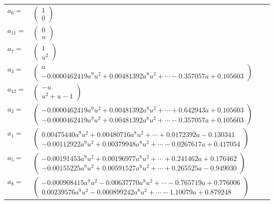 \documentclass[1p]{elsarticle_modified}
\theoremstyle{definition}
\begin{document}
\begin{tabular}{m{7pt} m{180pt} m{7pt} m{180pt} }
\flushright $a_{6}=$&$\begin{pmatrix}1\\0\end{pmatrix}$ \\
\flushright $a_{11}=$&$\begin{pmatrix}0\\u\end{pmatrix}$ \\
\flushright $a_{7}=$&$\begin{pmatrix}1\\u^2\end{pmatrix}$ \\
\flushright $a_{3}=$&$\begin{pmatrix}a\\-0.0000462419 a^{9} u^{2}+0.00481392 a^{8} u^{2}+\cdots-0.357057 a+0.105603\end{pmatrix}$ \\
\flushright $a_{12}=$&$\begin{pmatrix}- u\\u^2+u-1\end{pmatrix}$ \\
\flushright $a_{2}=$&$\begin{pmatrix}-0.0000462419 a^{9} u^{2}+0.00481392 a^{8} u^{2}+\cdots+0.642943 a+0.105603\\-0.0000462419 a^{9} u^{2}+0.00481392 a^{8} u^{2}+\cdots-0.357057 a+0.105603\end{pmatrix}$ \\
\flushright $a_{1}=$&$\begin{pmatrix}0.00475440 a^{9} u^{2}+0.00480716 a^{8} u^{2}+\cdots+0.0172392 a-0.130341\\-0.00112922 a^{9} u^{2}+0.00379948 a^{8} u^{2}+\cdots-0.0267617 a+0.417054\end{pmatrix}$ \\
\flushright $a_{5}=$&$\begin{pmatrix}-0.00191453 a^{9} u^{2}+0.00196977 a^{8} u^{2}+\cdots+0.241462 a+0.176462\\-0.00155225 a^{9} u^{2}+0.00591527 a^{8} u^{2}+\cdots+0.265525 a-0.949030\end{pmatrix}$ \\
\flushright $a_{8}=$&$\begin{pmatrix}-0.000908415 a^{9} u^{2}-0.00637770 a^{8} u^{2}+\cdots-0.765719 a+0.776006\\0.00239576 a^{9} u^{2}-0.000899242 a^{8} u^{2}+\cdots-1.10079 a+0.879248\end{pmatrix}$ \\

\end{tabular}
\end{document}
